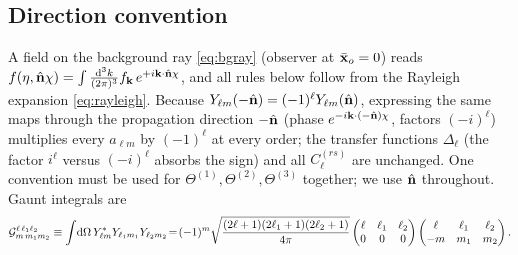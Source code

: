 \subsection{Direction convention}
\label{sec:dirconv}
A field on the background ray \eqref{eq:bgray} (observer at $\bar{\mathbf x}_o=0$) reads
$f(\eta,\hat{\mathbf n}\chi)=\int\frac{\mathrm d^3k}{(2\pi)^3}f_{\mathbf k}\,e^{+i\mathbf k\cdot\hat{\mathbf n}\chi}$, and all rules below follow from the Rayleigh expansion
\eqref{eq:rayleigh}.  Because $Y_{\ell m}(-\hat{\mathbf n})=(-1)^\ell Y_{\ell m}(\hat{\mathbf n})$, expressing the same maps through the propagation
direction $-\hat{\mathbf n}$ (phase $e^{-i\mathbf k\cdot(-\hat{\mathbf n})\chi}$, factors $(-i)^\ell$) multiplies every $a_{\ell m}$ by $(-1)^\ell$ at every order;
the transfer functions $\Delta_\ell$ (the factor $i^\ell$ versus $(-i)^\ell$ absorbs the sign) and all $C^{(rs)}_\ell$ are unchanged.  One
convention must be used for $\Theta^{(1)},\Theta^{(2)},\Theta^{(3)}$ together; we use $\hat{\mathbf n}$ throughout.  Gaunt integrals are
\begin{equation}
\mathcal G^{\ell\,\ell_1\ell_2}_{m\,m_1m_2}\equiv\int\!\mathrm d\Omega\,Y^*_{\ell m}Y_{\ell_1m_1}Y_{\ell_2m_2}
\!=\!(-1)^m\sqrt{\frac{(2\ell+1)(2\ell_1+1)(2\ell_2+1)}{4\pi}}\begin{pmatrix}\ell&\ell_1&\ell_2\\0&0&0\end{pmatrix}\begin{pmatrix}\ell&\ell_1&\ell_2\\-m&m_1&m_2\end{pmatrix}.
\end{equation}

